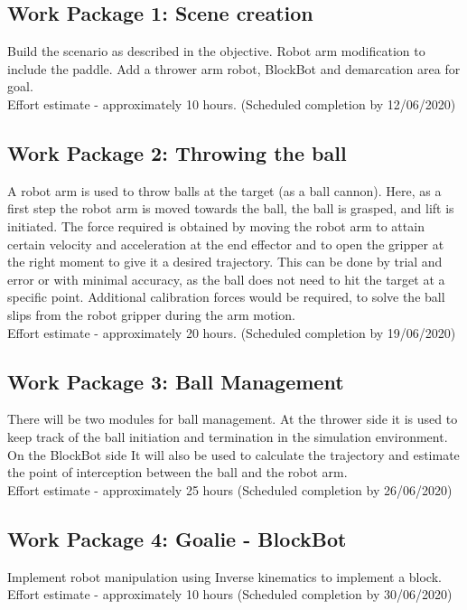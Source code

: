 \documentclass[12pt,pdftex,a4paper]{article}
\begin{document}
\subsection*{Work Package 1: Scene creation}
Build the scenario as described in the objective.
Robot arm modification to include the paddle.
Add a thrower arm robot, BlockBot and demarcation area for goal. \\
Effort estimate - approximately 10 hours. (Scheduled completion by 12/06/2020)

\subsection*{Work Package 2: Throwing the ball}
A robot arm is used to throw balls at the target (as a ball cannon).
Here, as a first step the robot arm is moved towards the ball, the ball is grasped, and lift is initiated.
The force required is obtained by moving the robot arm to attain certain velocity and acceleration at the end effector and to open the gripper at the right moment to give it a desired trajectory.
This can be done by trial and error or with minimal accuracy, as the ball does not need to hit the target at a specific point.
Additional calibration forces would be required, to solve the ball slips from the robot gripper during the arm motion. \\
Effort estimate - approximately 20 hours. (Scheduled completion by 19/06/2020)

\subsection*{Work Package 3: Ball Management}
There will be two modules for ball management.
At the thrower side it is used to keep track of the ball initiation and termination in the simulation environment.
On the BlockBot side It will also be used to calculate the trajectory and estimate the point of interception between the ball and the robot arm. \\
Effort estimate - approximately 25 hours (Scheduled completion by 26/06/2020)

\subsection*{Work Package 4: Goalie - BlockBot}
Implement robot manipulation using Inverse kinematics to implement a block. \\
Effort estimate - approximately 10 hours (Scheduled completion by 30/06/2020)
\end{document}
